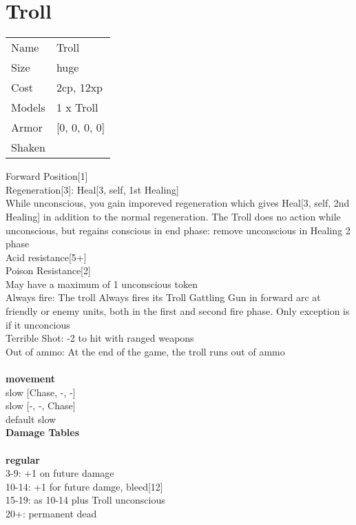 \clearpage

\section{ Troll }

\begin{tabular}{ll}
  Name & Troll \\
  Size & huge\\
  Cost & 2cp, 12xp\\
  Models & 1 x Troll\\
  Armor & [0, 0, 0, 0]\\
  Shaken & \\
\end{tabular}

\noindent Forward Position[1]\\ 
Regeneration[3]: Heal[3, self, 1st Healing]\\ 
While unconscious, you gain imporeved regeneration which gives Heal[3, self, 2nd Healing] in addition to the normal regeneration. The Troll does no action while unconscious, but regains conscious in end phase: remove unconscious in Healing 2 phase\\ 
Acid resistance[5+]\\ 
Poison Resistance[2]\\ 
May have a maximum of 1 unconscious token\\ 
Always fire: The troll Always fires its Troll Gattling Gun in forward arc at friendly or enemy units, both in the first and second fire phase. Only exception is if it unconcious\\ 
Terrible Shot: -2 to hit with ranged weapons\\ 
Out of ammo: At the end of the game, the troll runs out of ammo\\ 


\ \\ {\bf movement } \\
slow [Chase, -, -] \\
slow [-, -, Chase] \\
default slow \\


{\bf Damage Tables} \\
\ \\ {\bf regular } \\
3-9: +1 on future damage \\
10-14: +1 for future damge, bleed[12] \\
15-19: as 10-14 plus Troll unconscious \\
20+: permanent dead \\


